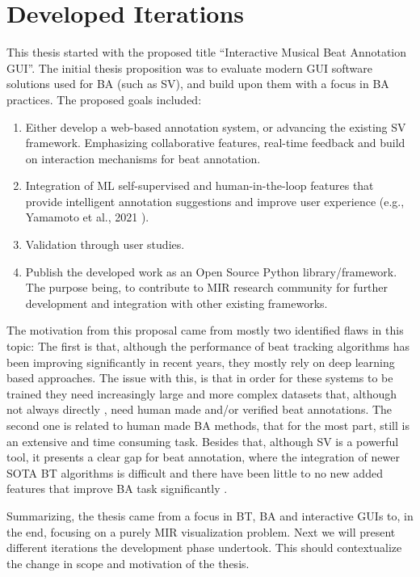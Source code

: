 \section{Developed Iterations}
This thesis started with the proposed title ``Interactive Musical Beat Annotation \ac{GUI}''. The initial thesis proposition was to evaluate modern \ac{GUI} software solutions used for \ac{BA} (such as  \ac{SV}), and build upon them with a focus in \ac{BA} practices.
The proposed goals included:

\begin{enumerate}
    \item Either develop a web-based annotation system, or advancing the existing SV framework. Emphasizing collaborative features, real-time feedback and build on interaction mechanisms for beat annotation. 
    \item Integration of \ac{ML} self-supervised and human-in-the-loop features that provide intelligent annotation suggestions and improve user experience (e.g., Yamamoto et al., 2021 \cite{yamamotoHumanintheLoopAdaptationInteractive2021}).
    \item Validation through user studies.
    \item Publish the developed work as an Open Source Python library/framework. The purpose being, to contribute to \ac{MIR} research community for further development and  integration with other existing frameworks.
\end{enumerate}

The motivation from this proposal came from mostly two identified flaws in this topic: The first is that, although the performance of beat tracking algorithms has been improving significantly in recent years, they mostly rely on deep learning based approaches. The issue with this, is that in order for these systems to be trained they need increasingly large and more complex datasets that, although not always directly \cite{peterAutomaticNoteLevelScoretoPerformance2023}, need human made and/or verified beat annotations. The second one is related to human made \ac{BA} methods, that for the most part, still is an extensive and time consuming task. Besides that, although \ac{SV} is a powerful tool, it presents a clear gap for beat annotation, where the integration of newer \ac{SOTA} \ac{BT} algorithms is difficult and there have been little to no new added features that improve \ac{BA} task significantly \cite{yamamotoHumanintheLoopAdaptationInteractive2021}.

Summarizing, the thesis came from a focus in \ac{BT}, \ac{BA} and interactive \ac{GUI}s to, in the end, focusing on a purely \ac{MIR} visualization problem. Next we will present different iterations the development phase undertook. This should contextualize the change in scope and motivation of the thesis.

